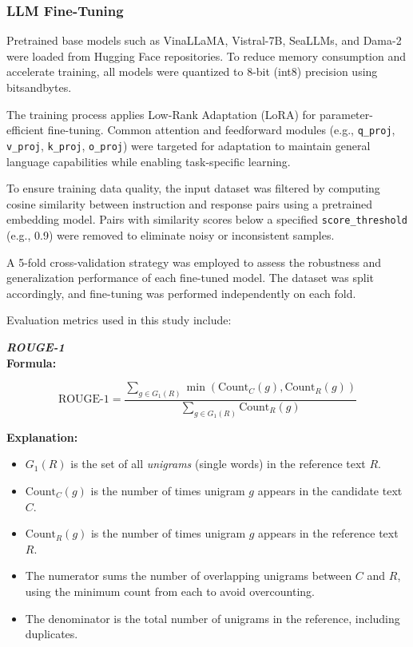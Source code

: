 \documentclass[conference]{IEEEtran}
\begin{document}
\subsubsection{LLM Fine-Tuning}
\label{sec:LLM Fine-Tuning}

Pretrained base models such as VinaLLaMA, Vistral-7B, SeaLLMs, and Dama-2 were loaded from Hugging Face repositories. To reduce memory consumption and accelerate training, all models were quantized to 8-bit (int8) precision using bitsandbytes.

The training process applies Low-Rank Adaptation (LoRA) for parameter-efficient fine-tuning. Common attention and feedforward modules (e.g., \texttt{q\_proj}, \texttt{v\_proj}, \texttt{k\_proj}, \texttt{o\_proj}) were targeted for adaptation to maintain general language capabilities while enabling task-specific learning.

To ensure training data quality, the input dataset was filtered by computing cosine similarity between instruction and response pairs using a pretrained embedding model. Pairs with similarity scores below a specified \texttt{score\_threshold} (e.g., 0.9) were removed to eliminate noisy or inconsistent samples.

A 5-fold cross-validation strategy was employed to assess the robustness and generalization performance of each fine-tuned model. The dataset was split accordingly, and fine-tuning was performed independently on each fold.

Evaluation metrics used in this study include:

\vspace{1em}
\noindent \textbf{\textit{ROUGE-1}}\\

\textbf{Formula:}

\begin{equation}
\text{ROUGE-1} = \frac{\sum_{g \in G_1(R)} \min \left( \text{Count}_C(g), \text{Count}_R(g) \right)}{\sum_{g \in G_1(R)} \text{Count}_R(g)}
\end{equation}

\textbf{Explanation:}
\begin{itemize}
  \item $G_1(R)$ is the set of all \textit{unigrams} (single words) in the reference text $R$.
  \item $\text{Count}_C(g)$ is the number of times unigram $g$ appears in the candidate text $C$.
  \item $\text{Count}_R(g)$ is the number of times unigram $g$ appears in the reference text $R$.
  \item The numerator sums the number of overlapping unigrams between $C$ and $R$, using the minimum count from each to avoid overcounting.
  \item The denominator is the total number of unigrams in the reference, including duplicates.
\end{itemize}
\end{document}
